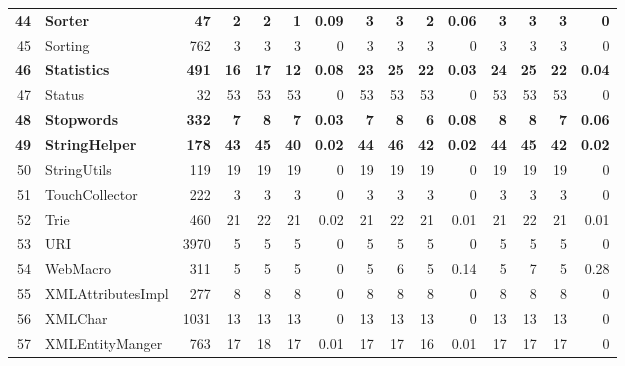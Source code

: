 \begin{table} [htp!]
{\begin{tabularx}{1 \textwidth}{r l r r r r r r r r r r r r r}
\textbf{44}						& \textbf{Sorter}					&\textbf{47}			& \textbf{2}		&	\textbf{2}	&	\textbf{1}	& 	\textbf{0.09}					& \textbf{3}		& \textbf{3} 		& \textbf{2}		& 		\textbf{0.06}			&\textbf{3}			& \textbf{3}			& \textbf{3}			&	\textbf{0}\\      
45						& Sorting					&762		& 3		&	3	&	3	& 	0					& 3		& 3 		& 3		& 		0			& 3			& 3			& 3			&	0\\      
\textbf{46}						& \textbf{Statistics}				&\textbf{491}		& \textbf{16}		&	\textbf{17}	&	\textbf{12}	&	\textbf{0.08}					& \textbf{23}		& \textbf{25} 		& \textbf{22}		& 		\textbf{0.03}			& \textbf{24}			& \textbf{25}			& \textbf{22}			&	\textbf{0.04}\\      
47						& Status					&32			& 53		&	53	&	53	& 	0					& 53		& 53 		& 53		& 		0			& 53			& 53			& 53			&	0\\      
\textbf{48}						& \textbf{Stopwords}				&\textbf{332}		& \textbf{7}		&	\textbf{8}	&	\textbf{7}	& 	\textbf{0.03}					& \textbf{7}		&  \textbf{8}		& \textbf{6}		& 		\textbf{0.08}			& \textbf{8}			& \textbf{8}			& \textbf{7}			&	\textbf{0.06}\\      
\textbf{49}						& \textbf{StringHelper}				&\textbf{178}		& \textbf{43}	 	& 	\textbf{45}	&	\textbf{40}	& 	\textbf{0.02}					& \textbf{44}		&  \textbf{46}		& \textbf{42}		& 		\textbf{0.02}			& \textbf{44}			& \textbf{45}			& \textbf{42}			&	\textbf{0.02}\\      
50						& StringUtils				&119		& 19 		&	19	&	19	& 	0					& 19		& 19 		& 19		& 		0			& 19			& 19			& 19			&	0\\      
51						& TouchCollector			&222		& 3		&	3	&	3	& 	0					& 3		&  3		& 3		& 		0			& 3			& 3			& 3			&	0\\      
52						& Trie					&460		& 21		&	22	&	21	& 	0.02					& 21		&  22		& 21		& 		0.01			& 21			& 22			& 21			&	0.01\\      
53						& URI					&3970		& 5 		&	5	&	5	& 	0					& 5		&  5		& 5		& 		0			& 5			& 5			& 5			&	0\\      
54						& WebMacro				&311		& 5		&	5	&	5	& 	0					& 5		&  6		& 5		& 		0.14			& 5			& 7			& 5			&	0.28\\      
55						& XMLAttributesImpl			&277		& 8		&	8	&	8	& 	0					& 8		&  8		& 8		& 		0			& 8			& 8			& 8			&	0\\      
56						& XMLChar				&1031		& 13		&	13	&	13	& 	0					& 13		&  13		& 13		& 		0			& 13			& 13			& 13			&	0\\      
57						& XMLEntityManger			&763		& 17		&	18	&	17	& 	0.01					& 17		&  17		& 16		& 		0.01			& 17			& 17			& 17			&	0\\      

\end{tabularx}}
\end{table}
